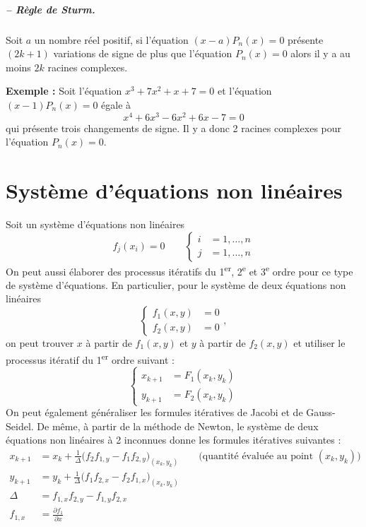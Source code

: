 \subparagraph{-- Règle de Sturm.}
Soit $a$ un nombre réel positif, si l'équation $(x - a)P_n(x) = 0$ présente
$(2k+1)$ variations de signe de plus que l'équation $P_n(x) = 0$ alors il y a
au moins $2k$ racines complexes.

\textbf{Exemple :} Soit l'équation $x^3 + 7x^2 + x + 7 = 0$ et l'équation
$(x - 1)P_n(x) = 0$ égale à
\[
  x^4 + 6x^3 - 6x^2 + 6x - 7 = 0
\]
qui présente trois changements de signe. Il y a donc 2 racines complexes pour
l'équation $P_n(x) = 0$.

\section{Système d'équations non linéaires}

Soit un système d'équations non linéaires
\[
  f_j(x_i) = 0 \qquad
  \left\{
  \begin{aligned}
    i &= 1, \dots, n\\
    j &= 1, \dots, n
  \end{aligned}
  \right.
\]
On peut aussi élaborer des processus itératifs du 1\textsuperscript{er},
2\textsuperscript{e} et 3\textsuperscript{e} ordre pour ce type de système
d'équations. En particulier, pour le système de deux équations non linéaires
\[
  \left\{
  \begin{aligned}
    f_1(x,y) &= 0\\
    f_2(x,y) &= 0
  \end{aligned}
  \right. ,
\]
on peut trouver $x$ à partir de $f_1(x,y)$ et $y$ à partir de $f_2(x,y)$ et
utiliser le processus itératif du 1\textsuperscript{er} ordre suivant :
\[
  \left\{
  \begin{aligned}
    x_{k+1} &= F_1(x_k, y_k)\\
    y_{k+1} &= F_2(x_k, y_k)
  \end{aligned}
  \right.
\]
On peut également généraliser les formules itératives de Jacobi et de
Gauss-Seidel. De même, à partir de la méthode de Newton, le système de deux
équations non linéaires à 2 inconnues donne les formules itératives
suivantes :
\[
  \begin{aligned}
    x_{k+1} &= x_k + \frac{1}{\Delta}\bigl(f_2f_{1,y} - f_1f_{2,y}\bigr)_{(x_k,y_k)}
      \qquad\text{(quantité évaluée au point } (x_k,y_k)\text{)}\\
    y_{k+1} &= y_k + \frac{1}{\Delta}\bigl(f_1f_{2,x} - f_2f_{1,x}\bigr)_{(x_k,y_k)}\\
    \Delta &= f_{1,x}f_{2,y} - f_{1,y}f_{2,x}\\
    f_{1,x} &= \frac{\partial f_1}{\partial x}
  \end{aligned}
\]
